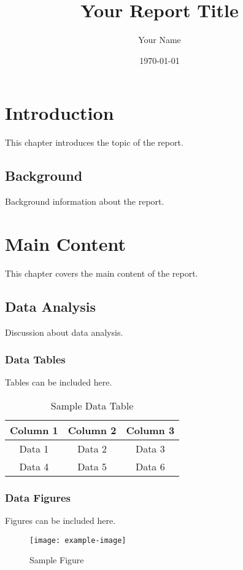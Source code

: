 \documentclass[11pt,a4paper]{report}
\title{Your Report Title}
\author{Your Name}
\date{\today}
\begin{document}
\maketitle

\tableofcontents
\newpage

\chapter{Introduction}
\label{chap:introduction}
This chapter introduces the topic of the report.

\section{Background}
\label{sec:background}
Background information about the report.

\chapter{Main Content}
\label{chap:maincontent}
This chapter covers the main content of the report.

\section{Data Analysis}
\label{sec:dataanalysis}
Discussion about data analysis.

\subsection{Data Tables}
\label{subsec:datatables}
Tables can be included here.

\begin{table}[h]
\centering
\caption{Sample Data Table}
\label{tab:sampledatatable}
\begin{tabular}{|c|c|c|}
\hline
Column 1 & Column 2 & Column 3 \\
\hline
Data 1 & Data 2 & Data 3 \\
Data 4 & Data 5 & Data 6 \\
\hline
\end{tabular}
\end{table}

\subsection{Data Figures}
\label{subsec:datafigures}
Figures can be included here.

\begin{figure}[h]
\centering
\texttt{[image: example-image]}
\caption{Sample Figure}
\label{fig:samplefigure}
\end{figure}
\end{document}
